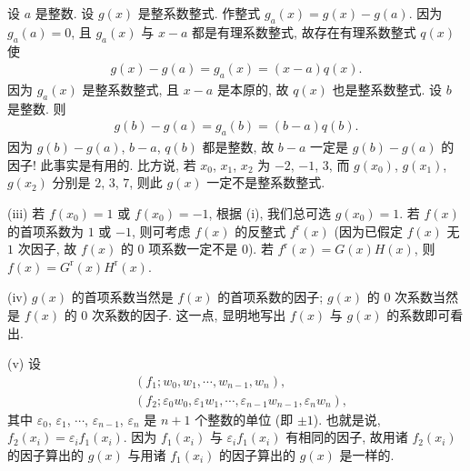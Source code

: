 \begin{remark}
    设 $a$ 是整数. 设 $g(x)$ 是整系数整式. 作整式 $g_a (x) = g(x) - g(a)$. 因为 $g_a (a) = 0$, 且 $g_a (x)$ 与 $x-a$ 都是有理系数整式, 故存在有理系数整式 $q(x)$ 使
    \begin{align*}
        g(x) - g(a) = g_a (x) = (x - a) q(x).
    \end{align*}
    因为 $g_a (x)$ 是整系数整式, 且 $x - a$ 是本原的, 故 $q(x)$ 也是整系数整式. 设 $b$ 是整数. 则
    \begin{align*}
        g(b) - g(a) = g_a (b) = (b - a) q(b).
    \end{align*}
    因为 $g(b) - g(a)$, $b - a$, $q(b)$ 都是整数, 故 $b - a$ 一定是 $g(b) - g(a)$ 的因子! 此事实是有用的. 比方说, 若 $x_0$, $x_1$, $x_2$ 为 $-2$, $-1$, $3$, 而 $g(x_0)$, $g(x_1)$, $g(x_2)$ 分别是 $2$, $3$, $7$, 则此 $g(x)$ 一定不是整系数整式.

    (iii) 若 $f(x_0) = 1$ 或 $f(x_0) = -1$, 根据 (i), 我们总可选 $g(x_0) = 1$. 若 $f(x)$ 的首项系数为 $1$ 或 $-1$, 则可考虑 $f(x)$ 的反整式 $f^{\mathrm{r}} (x)$ (因为已假定 $f(x)$ 无 $1$ 次因子, 故 $f(x)$ 的 $0$ 项系数一定不是 $0$). 若 $f^{\mathrm{r}} (x) = G(x) H(x)$, 则 $f(x) = G^{\mathrm{r}}(x) H^{\mathrm{r}}(x)$.

    (iv) $g(x)$ 的首项系数当然是 $f(x)$ 的首项系数的因子; $g(x)$ 的 $0$ 次系数当然是 $f(x)$ 的 $0$ 次系数的因子. 这一点, 显明地写出 $f(x)$ 与 $g(x)$ 的系数即可看出.

    (v) 设
    \begin{align*}
         & (f_1; w_0, w_1, \cdots, w_{n-1}, w_n),                                                             \\
         & (f_2; \varepsilon_0 w_0, \varepsilon_1 w_1, \cdots, \varepsilon_{n-1} w_{n-1}, \varepsilon_n w_n),
    \end{align*}
    其中 $\varepsilon_0$, $\varepsilon_1$, $\cdots$, $\varepsilon_{n-1}$, $\varepsilon_n$ 是 $n+1$ 个整数的单位 (即 $\pm 1$). 也就是说, $f_2 (x_i) = \varepsilon_i f_1 (x_i)$. 因为 $f_1 (x_i)$ 与 $\varepsilon_i f_1 (x_i)$ 有相同的因子, 故用诸 $f_2 (x_i)$ 的因子算出的 $g(x)$ 与用诸 $f_1 (x_i)$ 的因子算出的 $g(x)$ 是一样的.
\end{remark}

